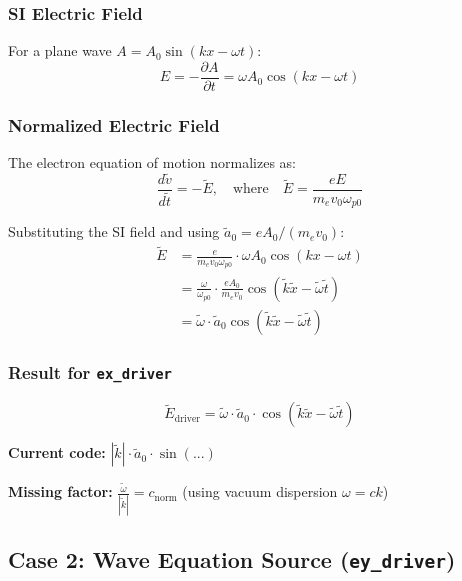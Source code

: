 \documentclass[11pt]{article}
\begin{document}
\subsubsection{SI Electric Field}
For a plane wave $A = A_0 \sin(kx - \omega t)$:
\begin{equation}
    E = -\frac{\partial A}{\partial t} = \omega A_0 \cos(kx - \omega t)
\end{equation}

\subsubsection{Normalized Electric Field}
The electron equation of motion normalizes as:
\begin{equation}
    \frac{d\tilde{v}}{d\tilde{t}} = -\tilde{E}, \quad \text{where} \quad \tilde{E} = \frac{eE}{m_e v_0 \omega_{p0}}
\end{equation}

Substituting the SI field and using $\tilde{a}_0 = eA_0/(m_e v_0)$:
\begin{align}
    \tilde{E} &= \frac{e}{m_e v_0 \omega_{p0}} \cdot \omega A_0 \cos(kx - \omega t) \\[6pt]
    &= \frac{\omega}{\omega_{p0}} \cdot \frac{eA_0}{m_e v_0} \cos(\tilde{k}\tilde{x} - \tilde{\omega}\tilde{t}) \\[6pt]
    &= \tilde{\omega} \cdot \tilde{a}_0 \cos(\tilde{k}\tilde{x} - \tilde{\omega}\tilde{t})
\end{align}

\subsubsection{Result for \texttt{ex\_driver}}
\begin{equation}
    \boxed{\tilde{E}_{\text{driver}} = \tilde{\omega} \cdot \tilde{a}_0 \cdot \cos(\tilde{k}\tilde{x} - \tilde{\omega}\tilde{t})}
\end{equation}

\textbf{Current code:} $|\tilde{k}| \cdot \tilde{a}_0 \cdot \sin(...)$

\textbf{Missing factor:} $\displaystyle\frac{\tilde{\omega}}{|\tilde{k}|} = c_{\text{norm}}$ (using vacuum dispersion $\omega = ck$)

\newpage
\subsection{Case 2: Wave Equation Source (\texttt{ey\_driver})}
\end{document}
